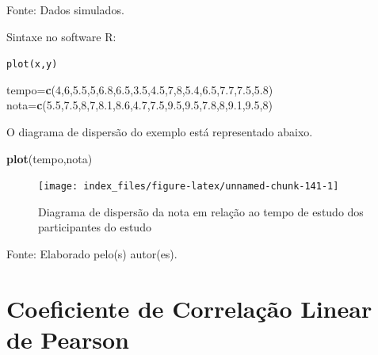 \documentclass[12pt,brazil,oneside]{book}
\newenvironment{Shaded}{\begin{snugshade}}{\end{snugshade}}
\newcommand{\DecValTok}[1]{\textcolor[rgb]{0.00,0.00,0.81}{#1}}
\newcommand{\FloatTok}[1]{\textcolor[rgb]{0.00,0.00,0.81}{#1}}
\newcommand{\KeywordTok}[1]{\textcolor[rgb]{0.13,0.29,0.53}{\textbf{#1}}}
\newcommand{\NormalTok}[1]{#1}
\begin{document}
Fonte: Dados simulados.

Sintaxe no software R:

\texttt{plot(x,y)}

\begin{Shaded}
\begin{Highlighting}[]
\NormalTok{tempo=}\KeywordTok{c}\NormalTok{(}\DecValTok{4}\NormalTok{,}\DecValTok{6}\NormalTok{,}\FloatTok{5.5}\NormalTok{,}\DecValTok{5}\NormalTok{,}\FloatTok{6.8}\NormalTok{,}\FloatTok{6.5}\NormalTok{,}\FloatTok{3.5}\NormalTok{,}\FloatTok{4.5}\NormalTok{,}\DecValTok{7}\NormalTok{,}\DecValTok{8}\NormalTok{,}\FloatTok{5.4}\NormalTok{,}\FloatTok{6.5}\NormalTok{,}\FloatTok{7.7}\NormalTok{,}\FloatTok{7.5}\NormalTok{,}\FloatTok{5.8}\NormalTok{)}
\NormalTok{nota=}\KeywordTok{c}\NormalTok{(}\FloatTok{5.5}\NormalTok{,}\FloatTok{7.5}\NormalTok{,}\DecValTok{8}\NormalTok{,}\DecValTok{7}\NormalTok{,}\FloatTok{8.1}\NormalTok{,}\FloatTok{8.6}\NormalTok{,}\FloatTok{4.7}\NormalTok{,}\FloatTok{7.5}\NormalTok{,}\FloatTok{9.5}\NormalTok{,}\FloatTok{9.5}\NormalTok{,}\FloatTok{7.8}\NormalTok{,}\DecValTok{8}\NormalTok{,}\FloatTok{9.1}\NormalTok{,}\FloatTok{9.5}\NormalTok{,}\DecValTok{8}\NormalTok{)}
\end{Highlighting}
\end{Shaded}

O diagrama de dispersão do exemplo está representado abaixo.

\begin{Shaded}
\begin{Highlighting}[]
\KeywordTok{plot}\NormalTok{(tempo,nota)}
\end{Highlighting}
\end{Shaded}

\begin{figure}[H]

{\centering \texttt{[image: index\_files/figure-latex/unnamed-chunk-141-1]} 

}

\caption{Diagrama de dispersão da nota em relação ao tempo de estudo dos participantes do estudo}\label{fig:unnamed-chunk-141}
\end{figure}

Fonte: Elaborado pelo(s) autor(es).

\hypertarget{coeficiente-de-correlacao-linear-de-pearson}{%
\section{Coeficiente de Correlação Linear de Pearson}\label{coeficiente-de-correlacao-linear-de-pearson}}
\end{document}
